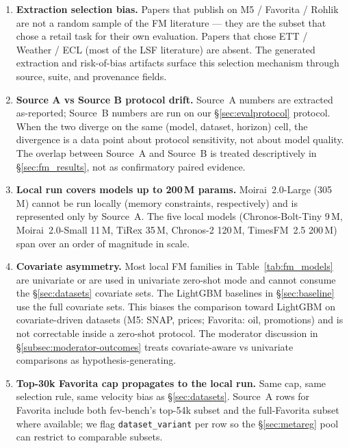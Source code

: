 \begin{enumerate}
  \item \textbf{Extraction selection bias.} Papers that publish on
    M5 / Favorita / Rohlik are not a random sample of the FM
    literature --- they are the subset that chose a retail task
    for their own evaluation. Papers that chose ETT / Weather /
    ECL (most of the LSF literature) are absent. The generated
    extraction and risk-of-bias artifacts surface this selection
    mechanism through source, suite, and provenance fields.

  \item \textbf{Source A vs Source B protocol drift.} Source~A numbers
    are extracted as-reported; Source~B numbers are run on our
    \S\ref{sec:evalprotocol} protocol. When the two diverge on the same (model,
    dataset, horizon) cell, the divergence is a data point
    about protocol sensitivity, not about model quality. The
    overlap between Source~A and Source~B is treated descriptively in
    \S\ref{sec:fm_results}, not as confirmatory paired evidence.

  \item \textbf{Local run covers models up to 200\,M params.}
    Moirai~2.0-Large (305\,M) cannot
    be run locally (memory constraints,
    respectively) and is represented only by Source~A. The five
    local models (Chronos-Bolt-Tiny 9\,M, Moirai~2.0-Small 11\,M,
    TiRex 35\,M, Chronos-2 120\,M, TimesFM~2.5 200\,M) span over an
    order of magnitude in scale.

  \item \textbf{Covariate asymmetry.} Most local FM families in
    Table~\ref{tab:fm_models} are univariate or are used in univariate
    zero-shot mode and cannot consume the \S\ref{sec:datasets}
    covariate sets. The LightGBM baselines in \S\ref{sec:baseline} use the
    full covariate sets. This biases the comparison toward
    LightGBM on covariate-driven datasets (M5: SNAP, prices;
    Favorita: oil, promotions) and is not correctable inside a
    zero-shot protocol. The moderator discussion in
    \S\ref{subsec:moderator-outcomes} treats covariate-aware vs
    univariate comparisons as hypothesis-generating.

  \item \textbf{Top-30k Favorita cap propagates to the local run.}
    Same cap, same selection rule, same velocity bias as
    \S\ref{sec:datasets}.
    Source~A rows for Favorita include both fev-bench's top-54k
    subset and the full-Favorita subset where available; we
    flag \texttt{dataset\_variant} per row so the
    \S\ref{sec:metareg} pool can restrict to comparable subsets.
\end{enumerate}
